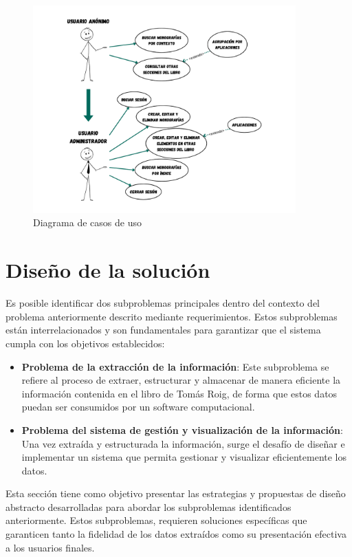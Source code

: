 \begin{figure}[ht!]
    \centering
    \includegraphics[width=0.9\textwidth]{Images/use-cases.png}
    \caption{Diagrama de casos de uso}
    \label{fig:use-cases}
\end{figure}




\section{Diseño de la solución}
Es posible identificar dos subproblemas principales dentro del contexto del problema anteriormente descrito mediante requerimientos. 
Estos subproblemas están interrelacionados y son fundamentales para garantizar que el sistema cumpla 
con los objetivos establecidos:

\begin{itemize}
    \item \textbf{Problema de la extracción de la información}: Este subproblema se refiere al proceso 
    de extraer, estructurar y almacenar de manera eficiente la información contenida en el libro de Tomás Roig, 
    de forma que estos datos puedan ser consumidos por un software computacional.
    \item \textbf{Problema del sistema de gestión y visualización de la información}: Una vez 
    extraída y estructurada la información, surge el desafío de diseñar e implementar un sistema que permita 
    gestionar y visualizar eficientemente los datos.
\end{itemize}

Esta sección tiene como objetivo presentar las estrategias y propuestas de diseño abstracto desarrolladas 
para abordar los subproblemas identificados anteriormente. 
Estos subproblemas, requieren soluciones específicas que garanticen tanto 
la fidelidad de los datos extraídos como su presentación efectiva a los usuarios finales.

